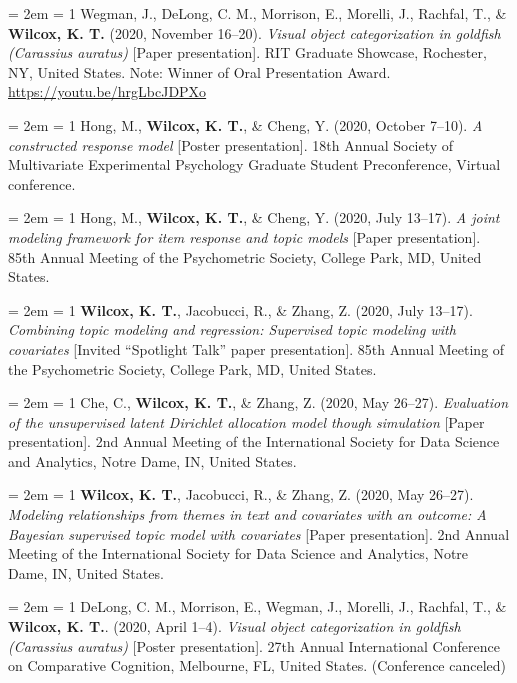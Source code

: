 \documentclass[
  12 pt,
]{article}
\begin{document}
\hangindent = 2em \hangafter = 1 Wegman, J., DeLong, C. M., Morrison,
E., Morelli, J., Rachfal, T., \& \textbf{Wilcox, K. T.} (2020, November
16--20). \emph{Visual object categorization in goldfish (Carassius
auratus)} {[}Paper presentation{]}. RIT Graduate Showcase, Rochester,
NY, United States. Note: Winner of Oral Presentation Award.
\url{https://youtu.be/hrgLbcJDPXo}

\hangindent = 2em \hangafter = 1 Hong, M., \textbf{Wilcox, K. T.}, \&
Cheng, Y. (2020, October 7--10). \emph{A constructed response model}
{[}Poster presentation{]}. 18th Annual Society of Multivariate
Experimental Psychology Graduate Student Preconference, Virtual
conference.

\hangindent = 2em \hangafter = 1 Hong, M., \textbf{Wilcox, K. T.}, \&
Cheng, Y. (2020, July 13--17). \emph{A joint modeling framework for item
response and topic models} {[}Paper presentation{]}. 85th Annual Meeting
of the Psychometric Society, College Park, MD, United States.

\hangindent = 2em \hangafter = 1 \textbf{Wilcox, K. T.}, Jacobucci, R.,
\& Zhang, Z. (2020, July 13--17). \emph{Combining topic modeling and
regression: Supervised topic modeling with covariates} {[}Invited
``Spotlight Talk'' paper presentation{]}. 85th Annual Meeting of the
Psychometric Society, College Park, MD, United States.

\hangindent = 2em \hangafter = 1 Che, C., \textbf{Wilcox, K. T.}, \&
Zhang, Z. (2020, May 26--27). \emph{Evaluation of the unsupervised
latent Dirichlet allocation model though simulation} {[}Paper
presentation{]}. 2nd Annual Meeting of the International Society for
Data Science and Analytics, Notre Dame, IN, United States.

\hangindent = 2em \hangafter = 1 \textbf{Wilcox, K. T.}, Jacobucci, R.,
\& Zhang, Z. (2020, May 26--27). \emph{Modeling relationships from
themes in text and covariates with an outcome: A Bayesian supervised
topic model with covariates} {[}Paper presentation{]}. 2nd Annual
Meeting of the International Society for Data Science and Analytics,
Notre Dame, IN, United States.

\hangindent = 2em \hangafter = 1 DeLong, C. M., Morrison, E., Wegman,
J., Morelli, J., Rachfal, T., \& \textbf{Wilcox, K. T.}. (2020, April
1--4). \emph{Visual object categorization in goldfish (Carassius
auratus)} {[}Poster presentation{]}. 27th Annual International
Conference on Comparative Cognition, Melbourne, FL, United States.
(Conference canceled)
\end{document}
